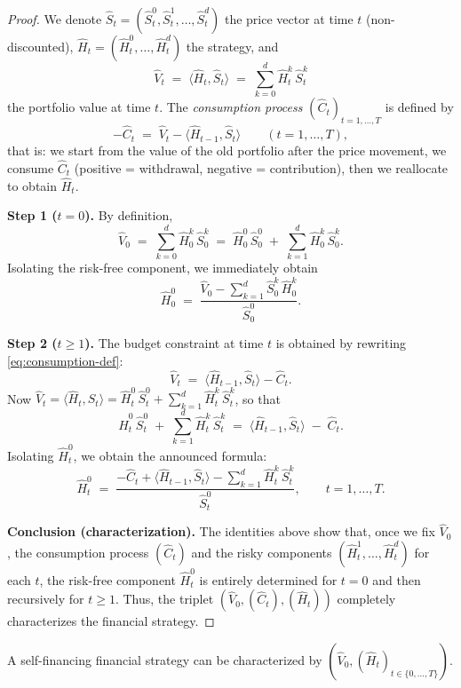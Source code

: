 \begin{proof}
We denote $\hat S_t=(\hat S_t^0,\hat S_t^1,\ldots,\hat S_t^d)$ the price vector at time $t$ (non-discounted),
$\hat H_t=(\hat H_t^0,\ldots,\hat H_t^d)$ the strategy, and
\[
\hat V_t \;=\; \langle \hat H_t,\hat S_t\rangle \;=\; \sum_{k=0}^d \hat H_t^k\,\hat S_t^k
\]
the portfolio value at time $t$.
The \emph{consumption process} $(\hat C_t)_{t=1,\ldots,T}$ is defined by
\begin{equation}\label{eq:consumption-def}
-\hat C_t \;=\; \hat V_t - \langle \hat H_{t-1}, \hat S_t\rangle
\qquad (t=1,\ldots,T),
\end{equation}
that is: we start from the value of the old portfolio after the price movement,
we consume $\hat C_t$ (positive = withdrawal, negative = contribution), then we reallocate to obtain $\hat H_t$.

\smallskip
\noindent\textbf{Step 1 ($t=0$).}
By definition,
\[
\hat V_0 \;=\; \sum_{k=0}^d \hat H_0^k\,\hat S_0^k
\;=\; \hat H_0^0\,\hat S_0^0 \;+\; \sum_{k=1}^d \hat H_0^k\,\hat S_0^k.
\]
Isolating the risk-free component, we immediately obtain
\[
\hat H_0^0 \;=\; \frac{\hat V_0 - \sum_{k=1}^d \hat S_0^k\,\hat H_0^k}{\hat S_0^0}.
\]

\smallskip
\noindent\textbf{Step 2 ($t\ge 1$).}
The budget constraint at time $t$ is obtained by rewriting \eqref{eq:consumption-def}:
\[
\hat V_t \;=\; \langle \hat H_{t-1}, \hat S_t\rangle - \hat C_t.
\]
Now $\hat V_t=\langle \hat H_t,\hat S_t\rangle = \hat H_t^0\,\hat S_t^0 + \sum_{k=1}^d \hat H_t^k\,\hat S_t^k$,
so that
\[
\hat H_t^0\,\hat S_t^0 \;+\; \sum_{k=1}^d \hat H_t^k\,\hat S_t^k
\;=\; \langle \hat H_{t-1}, \hat S_t\rangle \;-\; \hat C_t.
\]
Isolating $\hat H_t^0$, we obtain the announced formula:
\[
\hat H_t^0 \;=\; \frac{-\hat C_t + \langle \hat H_{t-1}, \hat S_t\rangle - \sum_{k=1}^d \hat H_t^k\,\hat S_t^k}{\hat S_t^0},
\qquad t=1,\ldots,T.
\]

\smallskip
\noindent\textbf{Conclusion (characterization).}
The identities above show that, once we fix
$\hat V_0$, the consumption process $(\hat C_t)$ and the risky components
$(\hat H_t^1,\ldots,\hat H_t^d)$ for each $t$, the risk-free component $\hat H_t^0$
is entirely determined for $t=0$ and then recursively for $t\ge 1$.
Thus, the triplet $(\hat V_0,(\hat C_t),(\hat H_t))$ completely characterizes the financial strategy.
\end{proof}

\begin{corollary}
A self-financing financial strategy can be characterized by $(\hat V_0, (\hat H_t)_{t\in\{0,\ldots,T\}})$.
\end{corollary}

